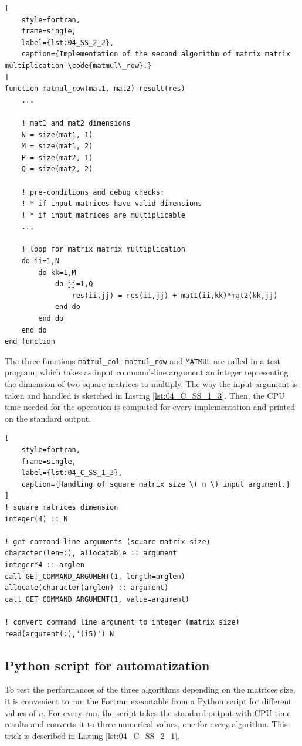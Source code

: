 \documentclass[pra, onecolumn, notitlepage, floats, 11pt]{revtex4-1}
\newcommand{\code}[2][black]{\color{#1}\texttt{#2}}
\begin{document}
\begin{lstlisting}[
    style=fortran,
    frame=single,
    label={lst:04_SS_2_2},
    caption={Implementation of the second algorithm of matrix matrix multiplication \code{matmul\_row}.}
]
function matmul_row(mat1, mat2) result(res)
    ...

    ! mat1 and mat2 dimensions
    N = size(mat1, 1)
    M = size(mat1, 2)
    P = size(mat2, 1)
    Q = size(mat2, 2)

    ! pre-conditions and debug checks:
    ! * if input matrices have valid dimensions
    ! * if input matrices are multiplicable
    ...

    ! loop for matrix matrix multiplication
    do ii=1,N
        do kk=1,M
            do jj=1,Q
                res(ii,jj) = res(ii,jj) + mat1(ii,kk)*mat2(kk,jj)
            end do
        end do
    end do
end function
\end{lstlisting}

The three functions \code{matmul\_col}, \code{matmul\_row} and \code{MATMUL} are called in a test program, which takes as input command-line argument an integer representing the dimension of two square matrices to multiply. The way the input argument is taken and handled is sketched in Listing \ref{lst:04_C_SS_1_3}. Then, the CPU time needed for the operation is computed for every implementation and printed on the standard output.

\medskip
\begin{lstlisting}[
    style=fortran,
    frame=single,
    label={lst:04_C_SS_1_3},
    caption={Handling of square matrix size \( n \) input argument.}
]
! square matrices dimension
integer(4) :: N

! get command-line arguments (square matrix size)
character(len=:), allocatable :: argument
integer*4 :: arglen
call GET_COMMAND_ARGUMENT(1, length=arglen)
allocate(character(arglen) :: argument)
call GET_COMMAND_ARGUMENT(1, value=argument)

! convert command line argument to integer (matrix size)
read(argument(:),'(i5)') N
\end{lstlisting}



\subsection{Python script for automatization}
\label{ssec:04_C_SS_2}
To test the performances of the three algorithms depending on the matrices size, it is convenient to run the Fortran executable from a Python script for different values of \( n \). For every run, the script takes the standard output with CPU time results and converts it to three numerical values, one for every algorithm. This trick is described in Listing \ref{lst:04_C_SS_2_1}.
\end{document}
